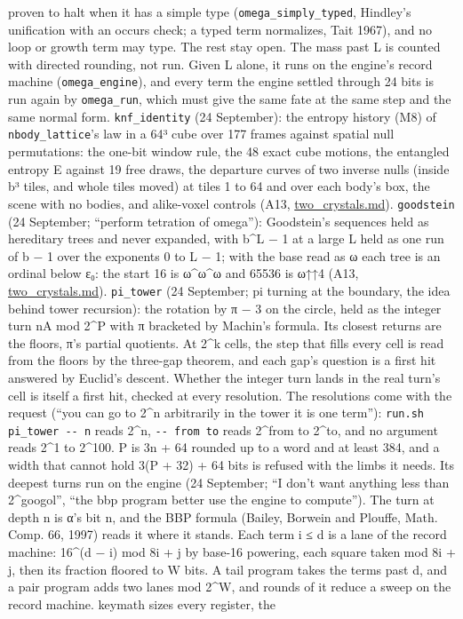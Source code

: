 \begin{description}
proven to halt when it has a simple type (\texttt{omega\_\allowbreak{}simply\_\allowbreak{}typed}, Hindley's unification with an occurs check; a typed term normalizes, Tait 1967), and no loop or growth term may type. The rest stay open. The mass past L is counted with directed rounding, not run. Given L alone, it runs on the engine's record machine (\texttt{omega\_\allowbreak{}engine}), and every term the engine settled through 24 bits is run again by \texttt{omega\_\allowbreak{}run}, which must give the same fate at the same step and the same normal form. \texttt{knf\_\allowbreak{}identity} (24 September): the entropy history (M8) of \texttt{nbody\_\allowbreak{}lattice}'s law in a 64³ cube over 177 frames against spatial null permutations: the one-bit window rule, the 48 exact cube motions, the entangled entropy E against 19 free draws, the departure curves of two inverse nulls (inside b³ tiles, and whole tiles moved) at tiles 1 to 64 and over each body's box, the scene with no bodies, and alike-voxel controls (A13, \hyperref[chap:two-crystals]{two\_\allowbreak{}crystals.md}). \texttt{goodstein} (24 September; “perform tetration of omega”): Goodstein's sequences held as hereditary trees and never expanded, with b\textasciicircum{}L − 1 at a large L held as one run of b − 1 over the exponents 0 to L − 1; with the base read as ω each tree is an ordinal below ε₀: the start 16 is ω\textasciicircum{}ω\textasciicircum{}ω and 65536 is ω↑↑4 (A13, \hyperref[chap:two-crystals]{two\_\allowbreak{}crystals.md}). \texttt{pi\_\allowbreak{}tower} (24 September; pi turning at the boundary, the idea behind tower recursion): the rotation by π − 3 on the circle, held as the integer turn nA mod 2\textasciicircum{}P with π bracketed by Machin's formula. Its closest returns are the floors, π's partial quotients. At 2\textasciicircum{}k cells, the step that fills every cell is read from the floors by the three-gap theorem, and each gap's question is a first hit answered by Euclid's descent. Whether the integer turn lands in the real turn's cell is itself a first hit, checked at every resolution. The resolutions come with the request (“you can go to 2\textasciicircum{}n arbitrarily in the tower it is one term”): \texttt{run.\allowbreak{}sh pi\_\allowbreak{}tower -\allowbreak{}-\allowbreak{} n} reads 2\textasciicircum{}n, \texttt{-\allowbreak{}-\allowbreak{} from to} reads 2\textasciicircum{}from to 2\textasciicircum{}to, and no argument reads 2\textasciicircum{}1 to 2\textasciicircum{}100. P is 3n + 64 rounded up to a word and at least 384, and a width that cannot hold 3(P + 32) + 64 bits is refused with the limbs it needs. Its deepest turns run on the engine (24 September; “I don't want anything less than 2\textasciicircum{}googol”, “the bbp program better use the engine to compute”). The turn at depth n is α's bit n, and the BBP formula (Bailey, Borwein and Plouffe, Math. Comp. 66, 1997) reads it where it stands. Each term i ≤ d is a lane of the record machine: 16\textasciicircum{}(d − i) mod 8i + j by base-16 powering, each square taken mod 8i + j, then its fraction floored to W bits. A tail program takes the terms past d, and a pair program adds two lanes mod 2\textasciicircum{}W, and rounds of it reduce a sweep on the record machine. keymath sizes every register, the 
\end{description}
